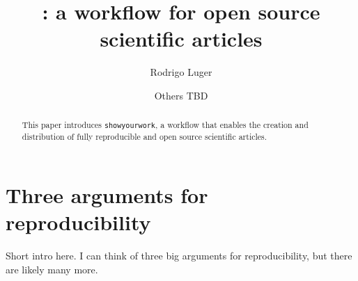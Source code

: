 \documentclass{aastex631}
\newcommand\xxx[1]{{\color{red}#1}}
\newcommand\syw{\texttt{showyourwork}\xspace}
\begin{document}
\title{\showyourwork: a workflow for open source scientific articles}

\author[0000-0002-0296-3826]{Rodrigo Luger}
\author{Others TBD}

%
\begin{abstract}
    This paper introduces \syw, a workflow that enables the creation and distribution of fully reproducible and open source scientific articles.
\end{abstract}

%
\section{Three arguments for reproducibility}
\label{sec:args}
\xxx{Short intro here. I can think of three big arguments for reproducibility, but there are likely many more.}

\end{document}
